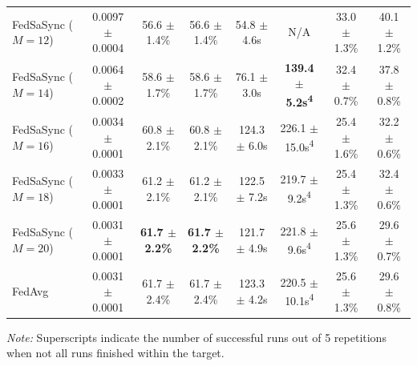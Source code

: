 \begin{table}[t]
{\begin{tabular}{lccccccc}
FedSaSync ($M = 12$) & 0.0097 $\pm$ 0.0004 & 56.6 $\pm$ 1.4\% & 56.6 $\pm$ 1.4\% & 54.8 $\pm$ 4.6s & N/A & 33.0 $\pm$ 1.3\% & 40.1 $\pm$ 1.2\% \\
FedSaSync ($M = 14$) & 0.0064 $\pm$ 0.0002 & 58.6 $\pm$ 1.7\% & 58.6 $\pm$ 1.7\% & 76.1 $\pm$ 3.0s & \textbf{139.4 $\pm$ 5.2s\textsuperscript{4}} & 32.4 $\pm$ 0.7\% & 37.8 $\pm$ 0.8\% \\
FedSaSync ($M = 16$) & 0.0034 $\pm$ 0.0001 & 60.8 $\pm$ 2.1\% & 60.8 $\pm$ 2.1\% & 124.3 $\pm$ 6.0s & 226.1 $\pm$ 15.0s\textsuperscript{4} & 25.4 $\pm$ 1.6\% & 32.2 $\pm$ 0.6\% \\
FedSaSync ($M = 18$) & 0.0033 $\pm$ 0.0001 & 61.2 $\pm$ 2.1\% & 61.2 $\pm$ 2.1\% & 122.5 $\pm$ 7.2s & 219.7 $\pm$ 9.2s\textsuperscript{4} & 25.4 $\pm$ 1.3\% & 32.4 $\pm$ 0.6\% \\
FedSaSync ($M = 20$) & 0.0031 $\pm$ 0.0001 & \textbf{61.7 $\pm$ 2.2\%} & \textbf{61.7 $\pm$ 2.2\%} & 121.7 $\pm$ 4.9s & 221.8 $\pm$ 9.6s\textsuperscript{4} & 25.6 $\pm$ 1.3\% & 29.6 $\pm$ 0.7\% \\
FedAvg & 0.0031 $\pm$ 0.0001 & 61.7 $\pm$ 2.4\% & 61.7 $\pm$ 2.4\% & 123.3 $\pm$ 4.2s & 220.5 $\pm$ 10.1s\textsuperscript{4} & 25.6 $\pm$ 1.3\% & 29.6 $\pm$ 0.8\% \\
\hline
\end{tabular}%
}
\par\vspace{0.8em}
\raggedright \footnotesize \textit{Note:} Superscripts indicate the number of successful runs out of 5 repetitions when not all runs finished within the target.
\end{table}
